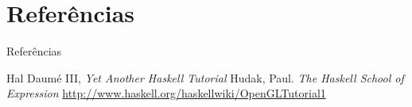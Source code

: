 \documentclass{beamer}
\begin{document}
			
\section{Referências}
\begin{frame}{Referências}
	\begin{thebibliography}{9}
	 Hal Daumé III, \textit{Yet Another Haskell Tutorial}
	 Hudak, Paul. \textit{The Haskell School of Expression}
	 \url{http://www.haskell.org/haskellwiki/OpenGLTutorial1}
	\end{thebibliography}
\end{frame}
	
	
\end{document}
